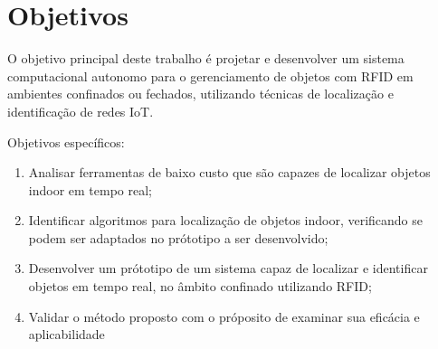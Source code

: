 \section{Objetivos}
O objetivo principal deste trabalho é projetar e desenvolver um sistema computacional autonomo para o gerenciamento de objetos com RFID 
em ambientes confinados ou fechados, utilizando técnicas de localização e identificação de redes IoT.


Objetivos específicos:
\begin{enumerate}

    \item Analisar ferramentas de baixo custo que são capazes de localizar objetos indoor em tempo real;
    
    \item Identificar algoritmos para localização de objetos indoor, verificando se podem ser adaptados no prótotipo a ser desenvolvido;
    
    
    
    \item Desenvolver um prótotipo de um sistema capaz de localizar e identificar objetos em tempo real, no âmbito confinado utilizando RFID;
    
    \item Validar o método proposto com o próposito de examinar sua eficácia e aplicabilidade
\end{enumerate}


